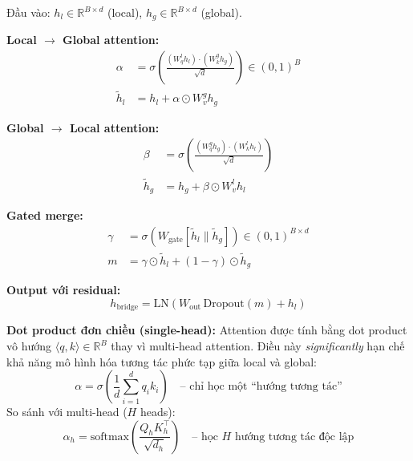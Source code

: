 \documentclass[12pt,a4paper]{article}
\begin{document}
\begin{mathbox}[title={CrossAttentionBridge -- Công thức đầy đủ}]
Đầu vào: $h_l \in \mathbb{R}^{B \times d}$ (local), $h_g \in \mathbb{R}^{B \times d}$ (global).

\textbf{Local $\to$ Global attention:}
\begin{align}
  \alpha &= \sigma\!\left(\frac{(W_q^l h_l) \cdot (W_k^g h_g)}{\sqrt{d}}\right) \in (0,1)^B \\
  \tilde{h}_l &= h_l + \alpha \odot W_v^g h_g
  \label{eq:cab_l2g}
\end{align}

\textbf{Global $\to$ Local attention:}
\begin{align}
  \beta &= \sigma\!\left(\frac{(W_q^g h_g) \cdot (W_k^l h_l)}{\sqrt{d}}\right) \\
  \tilde{h}_g &= h_g + \beta \odot W_v^l h_l
  \label{eq:cab_g2l}
\end{align}

\textbf{Gated merge:}
\begin{align}
  \gamma &= \sigma\!\left(W_\text{gate}[\tilde{h}_l \| \tilde{h}_g]\right) \in (0,1)^{B \times d} \\
  m &= \gamma \odot \tilde{h}_l + (1-\gamma) \odot \tilde{h}_g
\end{align}

\textbf{Output với residual:}
\begin{equation}
  \boxed{h_\text{bridge} = \text{LN}\!\left(W_\text{out}\, \text{Dropout}(m) + h_l\right)}
  \label{eq:cab_out}
\end{equation}
\end{mathbox}

\begin{issuebox}
\textbf{Dot product đơn chiều (single-head):} Attention được tính bằng
dot product vô hướng $\langle q, k \rangle \in \mathbb{R}^B$ thay vì
multi-head attention. Điều này \emph{significantly} hạn chế khả năng
mô hình hóa tương tác phức tạp giữa local và global:
\begin{equation}
  \alpha = \sigma\!\left(\frac{1}{d}\sum_{i=1}^d q_i k_i\right)
  \quad \text{-- chỉ học một ``hướng tương tác''}
\end{equation}
So sánh với multi-head ($H$ heads):
\begin{equation}
  \alpha_h = \text{softmax}\!\left(\frac{Q_h K_h^\top}{\sqrt{d_h}}\right)
  \quad \text{-- học $H$ hướng tương tác độc lập}
\end{equation}
\end{issuebox}
\end{document}
